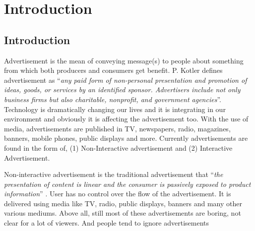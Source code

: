 
\chapter{Introduction} %

\label{Chapter1} %
\newpage



\section{Introduction}
Advertisement is the mean of conveying message(s) to people about something from which both producers and consumers get benefit. P. Kotler \cite{ad_def} defines advertisement as ``\emph{any paid form of non-personal presentation and promotion of ideas, goods, or services by an identified sponsor. Advertisers include not only business firms but also charitable, nonprofit, and government agencies}''. Technology is dramatically changing our lives and it is integrating in our environment and obviously it is affecting the advertisement too. With the use of media, advertisements are published in TV, newspapers, radio, magazines, banners, mobile phones, public displays and more. Currently advertisements are found in the form of, (1) Non-Interactive advertisement and (2) Interactive Advertisement.

Non-interactive advertisement is the traditional advertisement that ``\emph{the presentation of content is linear and the consumer is passively exposed to product information}'' \cite{Non_inter_vs_interAd}. User has no control over the flow of the advertisement. It is delivered using media like TV, radio, public displays, banners and many other various mediums. Above all, still most of these advertisements are boring, not clear for a lot of viewers. And people tend to ignore advertisements \cite{display_blindness, banner_blindness}


